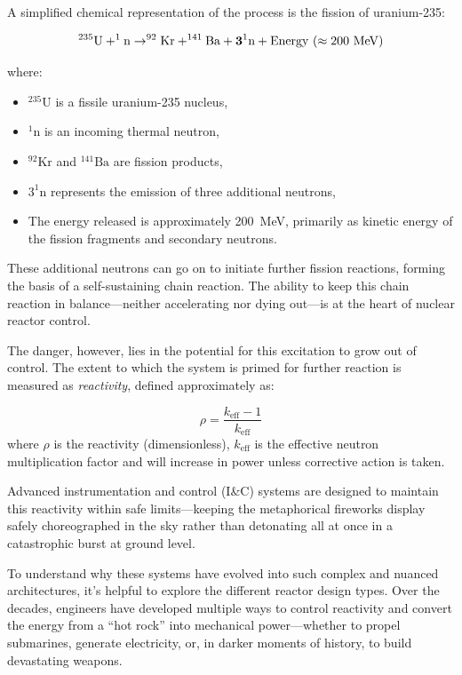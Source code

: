 \documentclass[12pt]{article}
\begin{document}
A simplified chemical representation of the process is the fission of uranium-235:

\begin{equation}
  ^{235}\text{U} + ^{1}\text{n} \rightarrow ^{92}\text{Kr} + ^{141}\text{Ba} +
	\text{\textbf{3}}^{1}\text{n} + \text{Energy}~(\approx 200~\text{MeV})
\end{equation}

\noindent where:
\begin{itemize}
  \item $^{235}\text{U}$ is a fissile uranium-235 nucleus,
  \item $^{1}\text{n}$ is an incoming thermal neutron,
  \item $^{92}\text{Kr}$ and $^{141}\text{Ba}$ are fission products,
  \item $3^{1}\text{n}$ represents the emission of three additional neutrons,
  \item The energy released is approximately 200~MeV, primarily as kinetic energy of the fission fragments and secondary neutrons.
\end{itemize}

These additional neutrons can go on to initiate further fission reactions, forming the basis of a self-sustaining chain reaction. The ability to keep this chain reaction in balance—neither accelerating nor dying out—is at the heart of nuclear reactor control.

The danger, however, lies in the potential for this excitation to grow out of control. The extent to which the system is primed for further reaction is measured as \textit{reactivity}, defined approximately as:

\begin{equation}
  \rho = \frac{k_{\text{eff}} - 1}{k_{\text{eff}}}
\end{equation}
where $\rho$ is the reactivity (dimensionless), $k_{\text{eff}}$ is the effective neutron multiplication factor and will increase in power unless corrective action is taken.

Advanced instrumentation and control (I\&C) systems are designed to maintain this reactivity within safe limits—keeping the metaphorical fireworks display safely choreographed in the sky rather than detonating all at once in a catastrophic burst at ground level.

To understand why these systems have evolved into such complex and nuanced architectures, it’s helpful to explore the different reactor design types. Over the decades, engineers have developed multiple ways to control reactivity and convert the energy from a “hot rock” into mechanical power—whether to propel submarines, generate electricity, or, in darker moments of history, to build devastating weapons.
\end{document}
